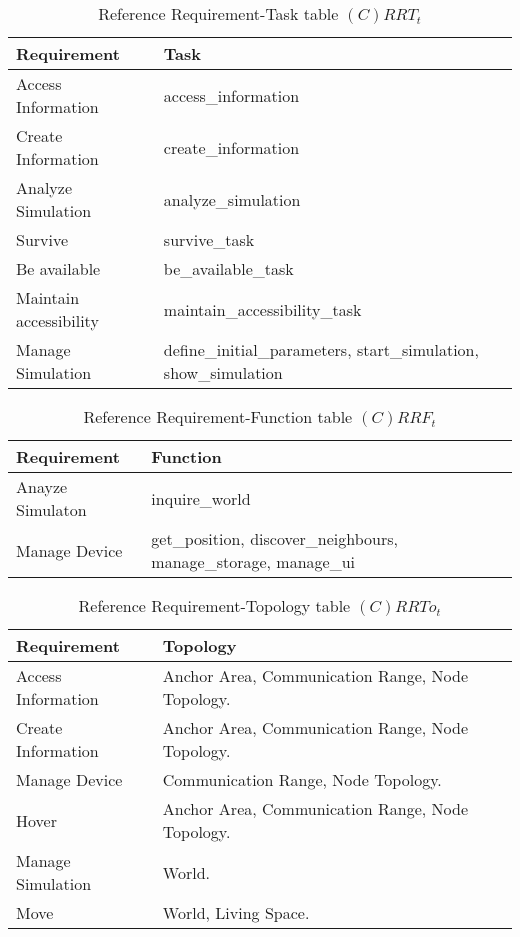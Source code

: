 \begin{table}[H]
	\centering
	\begin{tabular}{|p{4cm}|p{8cm}|}
			\hline
			\textbf{Requirement} & \textbf{Task} \\
			\hline
			Access Information & access\_information \\
			\hline
			Create Information & create\_information \\
			\hline
			Analyze Simulation & analyze\_simulation \\
			\hline
			Survive & survive\_task \\
			\hline
			Be available & be\_available\_task \\
			\hline
			Maintain accessibility & maintain\_accessibility\_task\\
			\hline
			Manage Simulation & define\_initial\_parameters, start\_simulation, show\_simulation \\
			\hline
		\end{tabular}
	\caption{Reference Requirement-Task table $(C)RRT_t$}
	\label{tab:crrtt}
\end{table}

\begin{table}[H]
	\centering
	\begin{tabular}{|p{4cm}|p{8cm}|}
			\hline
			\textbf{Requirement} & \textbf{Function} \\
			\hline
			Anayze Simulaton & inquire\_world \\
			\hline
			Manage Device & get\_position, discover\_neighbours, manage\_storage, manage\_ui \\
			\hline
		\end{tabular}
	\caption{Reference Requirement-Function table $(C)RRF_t$}
	\label{tab:crrft}
\end{table}

\begin{table}[H]
	\centering
	\begin{tabular}{|p{4cm}|p{8cm}|}
			\hline
			\textbf{Requirement} & \textbf{Topology} \\
			\hline
			Access Information & Anchor Area, Communication Range, Node Topology. \\
			\hline
			Create Information & Anchor Area, Communication Range, Node Topology. \\
			\hline
			Manage Device & Communication Range, Node Topology. \\
			\hline
			Hover & Anchor Area, Communication Range, Node Topology. \\
			\hline
			Manage Simulation & World. \\
			\hline
			Move & World, Living Space. \\
			\hline
		\end{tabular}
	\caption{Reference Requirement-Topology table $(C)RRTo_t$}
	\label{tab:crrtot}
\end{table}

